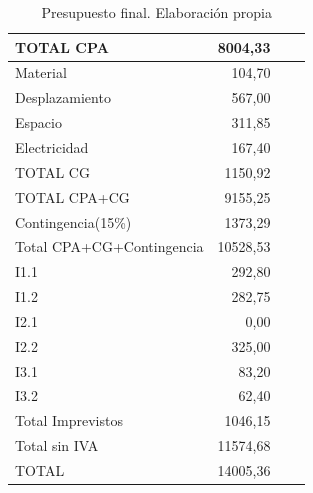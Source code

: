\documentclass[12pt]{article}
\begin{document}
\begin{table}[H]
\begin{center}
\begin{tabular}{ |l|r|c|r| }
                TOTAL CPA                    & 8004,33         \\ \hline
                Material                     & 104,70           \\ \hline
                Desplazamiento               & 567,00          \\ \hline
                Espacio                      & 311,85          \\ \hline
                Electricidad                 & 167,40          \\ \hline\rowcolor[gray]{.9}
                TOTAL CG                     & 1150,92         \\ \hline\rowcolor[gray]{.8}
                TOTAL CPA+CG                 & 9155,25         \\ \hline
                Contingencia(15\%)           & 1373,29         \\ \hline\rowcolor[gray]{.7}
                Total CPA+CG+Contingencia    & 10528,53        \\ \hline
                 I1.1                        & 292,80          \\ \hline
                 I1.2                        & 282,75          \\ \hline
                 I2.1                        & 0,00            \\ \hline
                 I2.2                        & 325,00          \\ \hline
                 I3.1                        & 83,20           \\ \hline
                 I3.2                        & 62,40           \\ \hline\rowcolor[gray]{.9}
                Total Imprevistos            & 1046,15         \\ \hline\rowcolor[gray]{.4}\color{white}
                Total sin IVA                       &\color{white} 11574,68        \\ \hline\rowcolor[gray]{.1}\color{white}
                TOTAL                       &\color{white} 14005,36        \\ \hline
            \end{tabular}
        \caption{Presupuesto final. Elaboración propia}
        \label{tab:presupuesto}
        \end{center}
        \end{table}
\clearpage
\end{document}
